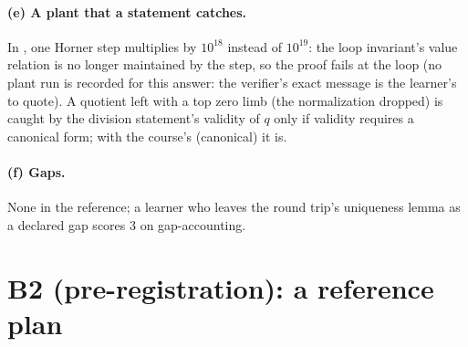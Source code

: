 \documentclass[11pt]{article}
\begin{document}
\paragraph{(e) A plant that a statement catches.} In , one
Horner step multiplies by $10^{18}$ instead of $10^{19}$: the loop invariant's
value relation is no longer maintained by the step, so the proof fails at the
loop (no plant run is recorded for this answer: the verifier's exact message is
the learner's to quote). A
quotient left with a top zero limb (the normalization dropped) is caught by
the division statement's validity of $q$ only if validity requires a
canonical form; with the course's  (canonical) it is.

\paragraph{(f) Gaps.} None in the reference; a learner who leaves the round
trip's uniqueness lemma as a declared gap scores 3 on gap-accounting.

\section*{B2 (pre-registration): a reference plan}
\end{document}
